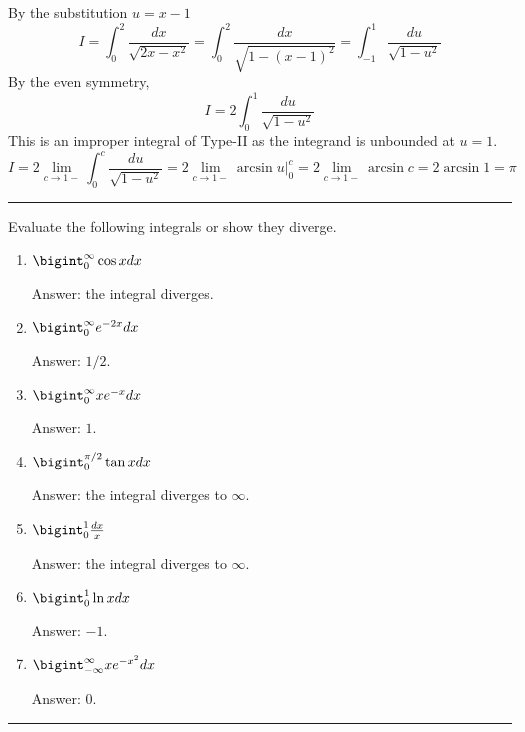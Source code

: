 \documentclass[../calc1-main.tex]{subfiles}
\begin{document}
\begin{minipage}{0.5\textwidth}
\begin{solution}
By the substitution $u = x-1$
\[
	I = \int_0^2 \frac{dx}{\sqrt{2x-x^2}} =
	\int_0^2 \frac{dx}{\sqrt{1-(x-1)^2}} =
	\int_{-1}^1 \frac{du}{\sqrt{1-u^2}}
\]
By the even symmetry,
\[
	I = 2\int_0^1 \frac{du}{\sqrt{1-u^2}}
\]
This is an improper integral of Type-II as the integrand is unbounded at $u=1$.
\[
	I = 2 \lim_{c \to 1-} \int_0^c \frac{du}{\sqrt{1-u^2}} =
	2 \lim_{c \to 1-} \left. \arcsin u \right \vert_0^c =
	2 \lim_{c \to 1-} \arcsin c = 2 \arcsin 1 = \pi
\]
\end{solution}
\end{minipage}%
\begin{minipage}{0.5\textwidth}
  \begin{figure}[H]
  	\centering
  \end{figure}
\end{minipage}



\rule{\textwidth}{1pt}
\begin{multicols}{2}
\begin{exercise}
Evaluate the following integrals or show they diverge.
	\begin{enumerate}
		\item $\bigint_0^{\infty} \cos x dx$

		Answer: the integral diverges.
		\item $\bigint_0^{\infty} e^{-2x} dx$

		Answer: $1/2$.
		\item $\bigint_0^{\infty} x e^{-x} dx$

		Answer: $1$.
		\item $\bigint_0^{\pi/2} \tan x dx$

		Answer: the integral diverges to $\infty$.
		\item $\bigint_0^1 \frac{dx}{x}$

		Answer: the integral diverges to $\infty$.
		\item $\bigint_0^1 \ln x dx$

		Answer: $-1$.

		\item $\bigint_{-\infty}^{\infty} x e^{-x^2} dx$

		Answer: $0$.
	\end{enumerate}
\end{exercise}
\end{multicols}
\rule{\textwidth}{1pt}
\end{document}
